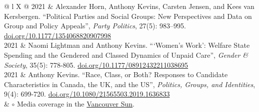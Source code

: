 \documentclass[letterpaper,fontsize=10.5pt]{scrartcl}
\begin{document}
\begin{longtblr}[entry=none,label=none]{@{} l X @{} }
	2021 & Alexander Horn, Anthony Kevins, Carsten Jensen, and Kees van Kersbergen. ``Political Parties and Social Groups: New Perspectives and Data on Group and Policy Appeals'', \textit{Party Politics}, 27(5): 983–995. \href{https://doi.org/10.1177/1354068820907998}{doi.org/10.1177/1354068820907998}                                             \\ 

	2021          & Naomi Lightman and  Anthony Kevins. ```Women's Work': Welfare State Spending and the Gendered and Classed Dynamics of Unpaid Care'', \textit{Gender \& Society}, 35(5): 778-805. \href{https://doi.org/10.1177/08912432211038695}{doi.org/10.1177/08912432211038695}                                                                          \\
	2021          & Anthony Kevins. ``Race, Class, or Both? Responses to Candidate Characteristics in Canada, the UK, and the US'', \textit{Politics, Groups, and Identities}, 9(4): 699-720. \href{https://doi.org/10.1080/21565503.2019.1636833}{doi.org/10.1080/21565503.2019.1636833}                                                                         \\
	& $\circ$ Media coverage in the \href{https://vancouversun.com/opinion/columnists/women-people-colour-get-fewer-votes-canada-studies}{Vancouver Sun}.                                                                                                    \\



\end{longtblr}
\end{document}

